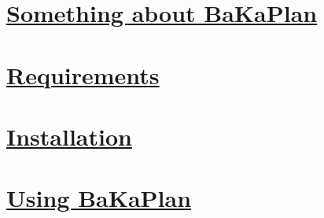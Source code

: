 \documentclass[12pt]{article}
\begin{document}

\begin{screen}
\ppttitle
\end{screen}
\footskip 0.7cm
\thispagestyle{empty} 
\pagetitle
\newpage
{}
\cfoot{\thepage}
\newpage
\tableofcontents
\newpage
{}
\cfoot{\thepage}

\newpage
\section{\underline{Something about BaKaPlan}}

\newpage
\section{\underline{Requirements}}

\newpage
\section{\underline{Installation}}

\newpage
\section{\underline{Using BaKaPlan}}

\end{document}
